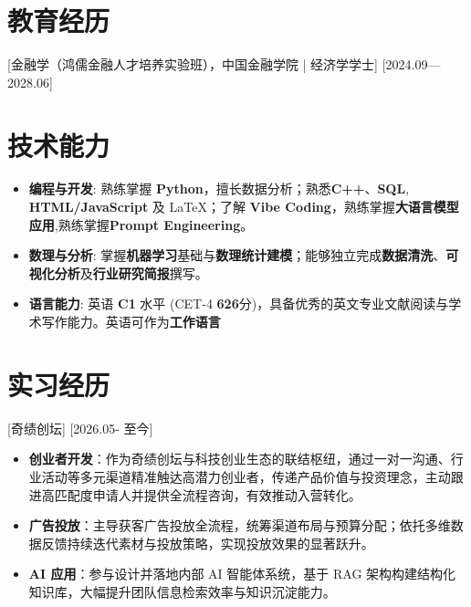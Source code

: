 \documentclass{resume}
\begin{document}

\ResumeTitle

\section{教育经历}
[金融学（鸿儒金融人才培养实验班），中国金融学院 | 经济学学士]
[2024.09—2028.06]

\section{技术能力}
\begin{itemize}[parsep=2pt]
  \item \textbf{编程与开发}: 熟练掌握 \textbf{Python}，擅长数据分析；熟悉\textbf{C++}、\textbf{SQL}, \textbf{HTML/JavaScript} 及 \LaTeX{}；了解 \textbf{Vibe Coding}，熟练掌握\textbf{大语言模型应用},熟练掌握\textbf{Prompt Engineering}。
  \item \textbf{数理与分析}: 掌握\textbf{机器学习}基础与\textbf{数理统计建模}；能够独立完成\textbf{数据清洗}、\textbf{可视化分析}及\textbf{行业研究简报}撰写。
  \item \textbf{语言能力}: 英语 \textbf{C1} 水平 (CET-4 \textbf{626}分)，具备优秀的英文专业文献阅读与学术写作能力。英语可作为\textbf{工作语言}
\end{itemize}

\section{实习经历}

[奇绩创坛]
[2026.05- 至今]

\begin{itemize}
  \item \textbf{创业者开发}：作为奇绩创坛与科技创业生态的联结枢纽，通过一对一沟通、行业活动等多元渠道精准触达高潜力创业者，传递产品价值与投资理念，主动跟进高匹配度申请人并提供全流程咨询，有效推动入营转化。
  \item \textbf{广告投放}：主导获客广告投放全流程，统筹渠道布局与预算分配；依托多维数据反馈持续迭代素材与投放策略，实现投放效果的显著跃升。
  \item \textbf{AI 应用}：参与设计并落地内部 AI 智能体系统，基于 RAG 架构构建结构化知识库，大幅提升团队信息检索效率与知识沉淀能力。
\end{itemize}
\end{document}
